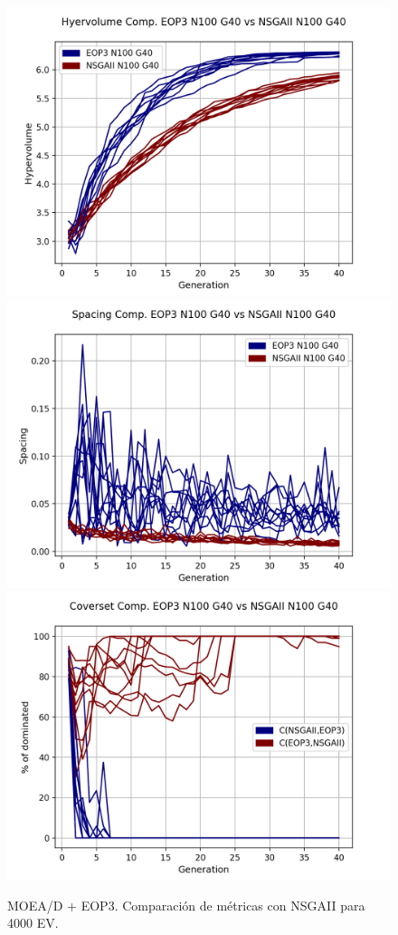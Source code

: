 \begin{figure}[H]
\includegraphics[scale=0.35]{../METRICS_PLOTS/Hypervol_COMP_EOP3N100G40_NSGAIIN100G40.png}
\includegraphics[scale=0.35]{../METRICS_PLOTS/Spacing_COMP_EOP3N100G40_NSGAIIN100G40.png}
\includegraphics[scale=0.35]{../METRICS_PLOTS/CoverSet_COMP_EOP3N100G40_NSGAIIN100G40.png}\\
\caption{MOEA/D + EOP3. Comparación de métricas con NSGAII para 4000 EV.}
\label{fig:25}
\end{figure}